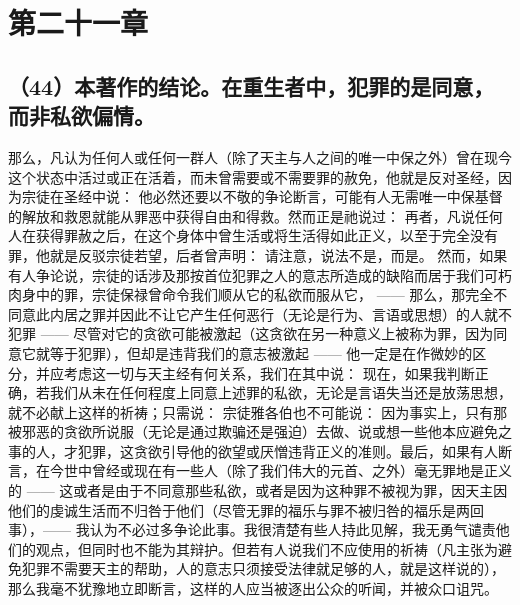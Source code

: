 
\section{第二十一章}


\subsection{（44）本著作的结论。在重生者中，犯罪的是同意，而非私欲偏情。}

那么，凡认为任何人或任何一群人（除了天主与人之间的唯一中保之外）曾在现今这个状态中活过或正在活着，而未曾需要或不需要罪的赦免，他就是反对圣经，因为宗徒在圣经中说： 他必然还要以不敬的争论断言，可能有人无需唯一中保基督的解放和救恩就能从罪恶中获得自由和得救。然而正是祂说过：  再者，凡说任何人在获得罪赦之后，在这个身体中曾生活或将生活得如此正义，以至于完全没有罪，他就是反驳宗徒若望，后者曾声明： 请注意，说法不是，而是。\newline{} 然而，如果有人争论说，宗徒的话涉及那按首位犯罪之人的意志所造成的缺陷而居于我们可朽肉身中的罪，宗徒保禄曾命令我们顺从它的私欲而服从它， —— 那么，那完全不同意此内居之罪并因此不让它产生任何恶行（无论是行为、言语或思想）的人就不犯罪 —— 尽管对它的贪欲可能被激起（这贪欲在另一种意义上被称为罪，因为同意它就等于犯罪），但却是违背我们的意志被激起 —— 他一定是在作微妙的区分，并应考虑这一切与天主经有何关系，我们在其中说： 现在，如果我判断正确，若我们从未在任何程度上同意上述罪的私欲，无论是言语失当还是放荡思想，就不必献上这样的祈祷；只需说： 宗徒雅各伯也不可能说： 因为事实上，只有那被邪恶的贪欲所说服（无论是通过欺骗还是强迫）去做、说或想一些他本应避免之事的人，才犯罪，这贪欲引导他的欲望或厌憎违背正义的准则。最后，如果有人断言，在今世中曾经或现在有一些人（除了我们伟大的元首、之外）毫无罪地是正义的 —— 这或者是由于不同意那些私欲，或者是因为这种罪不被视为罪，因天主因他们的虔诚生活而不归咎于他们（尽管无罪的福乐与罪不被归咎的福乐是两回事），—— 我认为不必过多争论此事。我很清楚有些人持此见解，我无勇气谴责他们的观点，但同时也不能为其辩护。但若有人说我们不应使用的祈祷（凡主张为避免犯罪不需要天主的帮助，人的意志只须接受法律就足够的人，就是这样说的），那么我毫不犹豫地立即断言，这样的人应当被逐出公众的听闻，并被众口诅咒。\par

